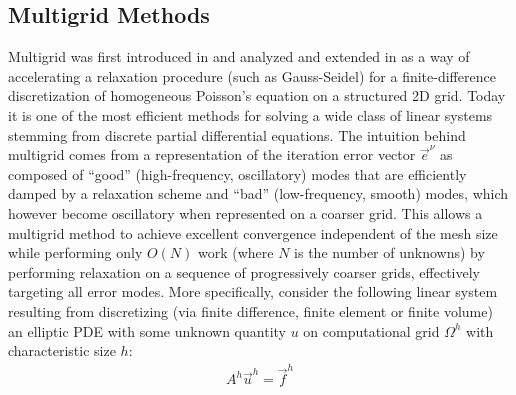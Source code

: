 \subsection{Multigrid Methods}
\label{subsec:related_work_multigrid}

Multigrid was first introduced in \cite{Fedorenko1962} and analyzed and extended in \cite{Fedorenko1964,Bakhvalov1966,Nicolaides1975,Brandt1977} as a way of accelerating a relaxation procedure (such as Gauss-Seidel) for a finite-difference discretization of homogeneous Poisson's equation on a structured 2D grid.   Today it is one of the most efficient methods for solving a wide class of linear systems stemming from discrete partial differential equations.   The intuition behind multigrid comes from a representation of the iteration error vector $\vec{e}^{\nu}$ as composed of ``good'' (high-frequency, oscillatory) modes that are efficiently damped by a relaxation scheme and ``bad'' (low-frequency, smooth) modes, which however become oscillatory when represented on a coarser grid.   This allows a multigrid method to achieve excellent convergence independent of the mesh size while performing only $O(N)$ work (where $N$ is the number of unknowns) by performing relaxation on a sequence of progressively coarser grids, effectively targeting all error modes.   More specifically, consider the following linear system resulting from discretizing (via finite difference, finite element or finite volume) an elliptic PDE with some unknown quantity $u$ on computational grid $\Omega^h$ with characteristic size $h$:
\begin{align}
    A^h \vec{u}^h = \vec{f}^h
\end{align}

